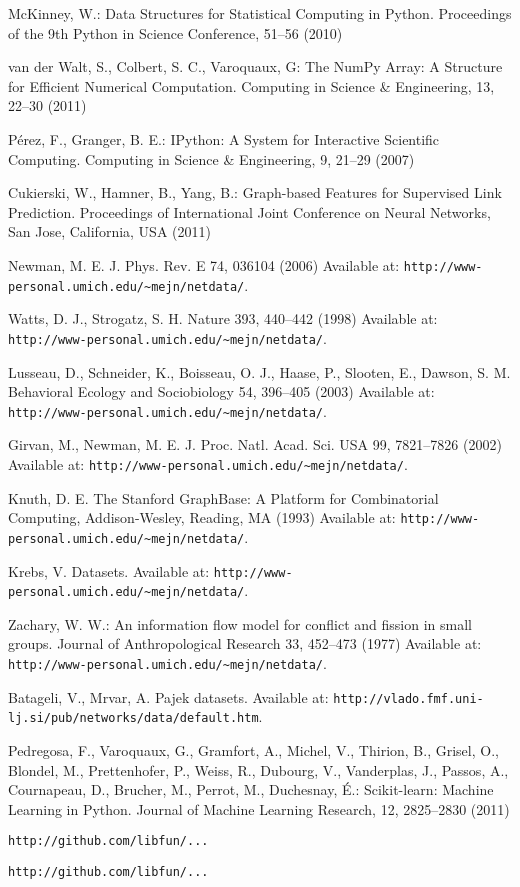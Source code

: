 \documentclass{llncs}
\begin{document}
\begin{thebibliography}{28}
McKinney, W.:
Data Structures for Statistical Computing in Python.
Proceedings of the 9th Python in Science Conference, 51--56 (2010)

van der Walt, S., Colbert, S. C., Varoquaux, G:
The NumPy Array: A Structure for Efficient Numerical Computation.
Computing in Science \& Engineering, 13, 22--30 (2011)

P{\'e}rez, F., Granger, B. E.:
IPython: A System for Interactive Scientific Computing.
Computing in Science \& Engineering, 9, 21--29 (2007)

Cukierski, W., Hamner, B., Yang, B.:
Graph-based Features for Supervised Link Prediction.
Proceedings of International Joint Conference on Neural Networks, San Jose, California, USA (2011)

Newman, M. E. J.
Phys. Rev. E 74, 036104 (2006)
Available at: \texttt{http://www-personal.umich.edu/\~{}mejn/netdata/}.

Watts, D. J., Strogatz, S. H.
Nature 393, 440--442 (1998) 
Available at: \texttt{http://www-personal.umich.edu/\~{}mejn/netdata/}.

Lusseau, D., Schneider, K., Boisseau, O. J., Haase, P., Slooten, E., Dawson, S. M.
Behavioral Ecology and Sociobiology 54, 396--405 (2003)
Available at: \texttt{http://www-personal.umich.edu/\~{}mejn/netdata/}.

Girvan, M., Newman, M. E. J.
Proc. Natl. Acad. Sci. USA 99, 7821--7826 (2002)
Available at: \texttt{http://www-personal.umich.edu/\~{}mejn/netdata/}.

Knuth, D. E.
The Stanford GraphBase: A Platform for Combinatorial Computing, Addison-Wesley, Reading, MA (1993)
Available at: \texttt{http://www-personal.umich.edu/\~{}mejn/netdata/}.

Krebs, V.
Datasets. 
Available at: \texttt{http://www-personal.umich.edu/\~{}mejn/netdata/}.

Zachary, W. W.:
An information flow model for conflict and fission in small groups.
Journal of Anthropological Research 33, 452--473 (1977)
Available at: \texttt{http://www-personal.umich.edu/\~{}mejn/netdata/}.

Batageli, V., Mrvar, A.
Pajek datasets. 
Available at: \texttt{http://vlado.fmf.uni-lj.si/pub/networks/data/default.htm}.

Pedregosa, F., Varoquaux, G., Gramfort, A., Michel, V., Thirion, B., Grisel, O., Blondel, M., Prettenhofer, P., Weiss, R., Dubourg, V., Vanderplas, J., Passos, A., Cournapeau, D., Brucher, M., Perrot, M., Duchesnay, {\'E}.:
Scikit-learn: Machine Learning in Python.
Journal of Machine Learning Research, 12, 2825--2830 (2011) 

\texttt{http://github.com/libfun/...}

\texttt{http://github.com/libfun/...}

\end{thebibliography}
\end{document}
